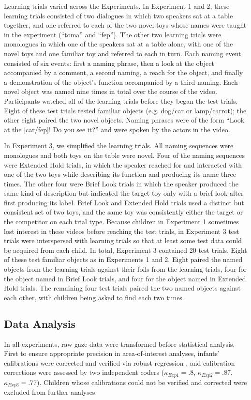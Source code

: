 \documentclass{pnastwo}
\begin{document}
\begin{article}
\begin{materials}
Learning trials varied across the Experiments. In Experiment 1 and 2, these learning trials consisted of two dialogues in which two speakers sat at a table together, and one referred to each of the two novel toys whose names were taught in the experiment (``toma'' and ``fep''). The other two learning trials were monologues in which one of the speakers sat at a table alone, with one of the novel toys and one familiar toy and referred to each in turn. Each naming event consisted of six events: first a naming phrase, then a look at the object accompanied by a comment, a second naming, a reach for the object, and finally a demonstration of the object's function accompanied by a third naming. Each novel object was named nine times in total over the course of the video. Participants watched all of the learning trials before they began the test trials. Eight of these test trials tested familiar objects (e.g. dog/car or lamp/carrot); the other eight paired the two novel objects. Naming phrases were of the form ``Look at the [car/fep]! Do you see it?'' and were spoken by the actors in the video.

In Experiment 3, we simplified the learning trials. All naming sequences were monologues and both toys on the table were novel.  Four of the naming sequences were Extended Hold trials, in which the speaker reached for and interacted with one of the two toys while describing its function and producing its name three times. The other four were Brief Look trials in which the speaker produced the same kind of description but indicated the target toy only with a brief look after first producing its label. Brief Look and Extended Hold trials used a distinct but consistent set of two toys, and the same toy was consistently either the target or the competitor on each trial type. Because children in Experiment 1 sometimes lost interest in these videos before reaching the test trials, in Experiment 3 test trials were interspersed with learning trials so that at least some test data could be acquired from each child. In total, Experiment 3 contained 20 test trials. Eight of these test familiar objects as in Experiments 1 and 2. Eight paired the named objects from the learning trials against their foils from the learning trials, four for the object named in Brief Look trials, and four for the object named in Extended Hold trials. The remaining four test trials paired the two named objects against each other, with children being asked to find each two times.

\setlength{\parskip}{1em}
\subsection{Data Analysis} In all experiments, raw gaze data were transformed before statistical analysis. First to ensure appropriate precision in area-of-interest analyses, infants' calibrations were corrected and verified via robust regression \citep[described in][]{frank2012}, and calibration corrections were assessed by two independent coders ({\small$\kappa_{Exp1} = .8$}, {\small$\kappa_{Exp2} = .87$}, {\small$\kappa_{Exp3} = .77$}). Children whose calibrations could not be verified and corrected were excluded from further analyses.


\end{materials}
\end{article}
\end{document}
